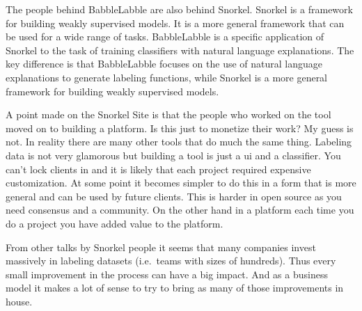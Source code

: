 \documentclass[
  letterpaper,
  DIV=11,
  numbers=noendperiod,
  oneside]{scrartcl}
\begin{document}

The people behind BabbleLabble are also behind Snorkel. Snorkel is a
framework for building weakly supervised models. It is a more general
framework that can be used for a wide range of tasks. BabbleLabble is a
specific application of Snorkel to the task of training classifiers with
natural language explanations. The key difference is that BabbleLabble
focuses on the use of natural language explanations to generate labeling
functions, while Snorkel is a more general framework for building weakly
supervised models.

A point made on the Snorkel Site is that the people who worked on the
tool moved on to building a platform. Is this just to monetize their
work? My guess is not. In reality there are many other tools that do
much the same thing. Labeling data is not very glamorous but building a
tool is just a ui and a classifier. You can't lock clients in and it is
likely that each project required expensive customization. At some point
it becomes simpler to do this in a form that is more general and can be
used by future clients. This is harder in open source as you need
consensus and a community. On the other hand in a platform each time you
do a project you have added value to the platform.

From other talks by Snorkel people it seems that many companies invest
massively in labeling datasets (i.e.~teams with sizes of hundreds). Thus
every small improvement in the process can have a big impact. And as a
business model it makes a lot of sense to try to bring as many of those
improvements in house.
\end{document}
